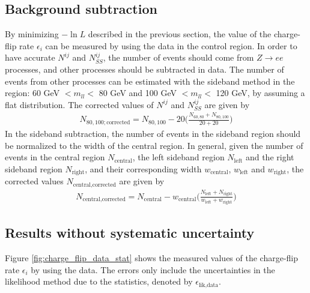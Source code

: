 \subsection{Background subtraction}
\label{sec:Background_subtraction}
By minimizing $- \ln L$ described in the previous section, the value of the charge-flip rate $\epsilon_i$ can be measured by using the data in the control region.
In order to have accurate $N^{ij}$ and $N^{ij}_{SS}$, the number of events should come from $Z \rightarrow ee$ processes, and other processes should be subtracted in data.
The number of events from other processes can be estimated with the sideband method in the region: 60 GeV $<m_{ll}<$ 80 GeV and 100 GeV $<m_{ll}<$ 120 GeV, by assuming a flat distribution.
The corrected values of $N^{ij}$ and $N^{ij}_{SS}$ are given by
\begin{align}
N_{80,100;\text{corrected}} = N_{80,100} - 20 \Big( \frac{N_{60,80} + N_{80,100}}{20 + 20} \Big)
\end{align}
In the sideband subtraction, the number of events in the sideband region should be normalized to the width of the central region.
In general, given the number of events in the central region $N_{\text{central}}$, the left sideband region $N_{\text{left}}$ and the right sideband region $N_{\text{right}}$, and their corresponding width $w_{\text{central}}$, $w_{\text{left}}$ and $w_{\text{right}}$, the corrected values $N_{\text{central,corrected}}$ are given by
\begin{align}
N_{\text{central,corrected}} = N_{\text{central}} - w_{\text{central}} \Big( \frac{N_{\text{left}} + N_{\text{right}}}{w_{\text{left}} + w_{\text{right}}} \Big)
\end{align}

\subsection{Results without systematic uncertainty}
\label{sec:results_stat}
Figure \ref{fig:charge_flip_data_stat} shows the measured values of the charge-flip rate $\epsilon_i$ by using the data.
The errors only include the uncertainties in the likelihood method due to the statistics, denoted by $\epsilon_{\text{lik,data}}$.

